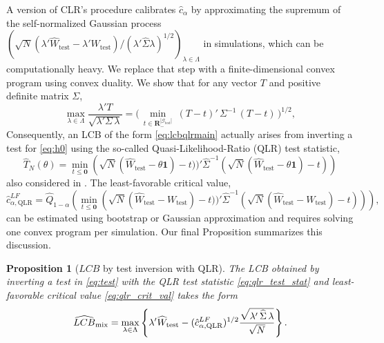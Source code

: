 \documentclass[12pt]{article}
\numberwithin{equation}{section}
\theoremstyle{plain}                         %
\newtheorem{proposition}{Proposition}
\theoremstyle{definition}                  %
\theoremstyle{remark}                      %
\begin{document}
A version of CLR's procedure calibrates $\hat{c}_{\alpha}$ by approximating the supremum of the self-normalized Gaussian process $(\sqrt{N}(\lambda'\widehat{W}_{\text{test}} - \lambda'W_{\text{test}}) / (\lambda'\widehat{\Sigma}\lambda)^{1/2} )_{\lambda \in \Lambda}$ in simulations, which can be computationally heavy. We replace that step with a finite-dimensional convex program using convex duality. We show that for any vector $T$ and positive definite matrix $\Sigma$,
\begin{equation}
\label{eq:gp-to-convex}
\max_{\lambda\in\Lambda}\frac{\lambda'T}{\sqrt{\lambda'\Sigma\,\lambda}} =
\Big(\,\min_{t \in \mathbf{R}^{|\mathcal{G}_{\text{test}}|}_{-} }\ (T-t)'\,\Sigma^{-1}\,(T-t)\,\Big)^{1/2},
\end{equation}
Consequently, an LCB of the form \eqref{eq:lcbqlrmain} actually arises from inverting a test for \eqref{eq:h0} using the so-called Quasi-Likelihood-Ratio (QLR) test statistic,
\begin{equation} \label{eq:qlr_test_stat}
\hat{T}_N(\theta) = \min \limits_{t \leq \mathbf{0}}\left(\sqrt{N}(\widehat{W}_{\text{test}} - \theta \bm{1}) - t))'\widehat{\Sigma}^{-1}(\sqrt{N}(\widehat{W}_{\text{test}} - \theta \bm{1}) - t)\right)
\end{equation}
also considered in \citet{andrews2010inference}. The least-favorable critical value,
\begin{equation} \label{eq:qlr_crit_val}
\hat{c}_{\alpha, \text{QLR}}^{LF} = \hat{Q}_{1-\alpha} \left( \min \limits_{t \leq \mathbf{0}}\left(\sqrt{N}(\widehat{W}_{\text{test}} - W_{\text{test}}) - t))'\widehat{\Sigma}^{-1}(\sqrt{N}(\widehat{W}_{\text{test}} - W_{\text{test}}) - t)\right) \right),
\end{equation}
can be estimated using bootstrap or Gaussian approximation and requires solving one convex program per simulation. Our final Proposition summarizes this discussion. 

\begin{proposition}[$LCB$ by test inversion with QLR]
\label{prop:qlr}
The LCB obtained by inverting a test in \eqref{eq:test} with the QLR test statistic \eqref{eq:qlr_test_stat} and least-favorable critical value \eqref{eq:qlr_crit_val}  takes the form
\begin{equation} 
\widehat{LCB}_{\text{\normalfont mix}} = \max_{\lambda\in\Lambda} \left\{ \lambda^{\prime} \widehat{W}_{\text{\normalfont test}} - (\hat{c}_{\alpha, \text{QLR}}^{LF})^{1/2} \frac{\sqrt{\lambda'\,\widehat\Sigma\,\lambda}}{\sqrt{N}} \right\}.
\end{equation}
\end{proposition}
\end{document}

